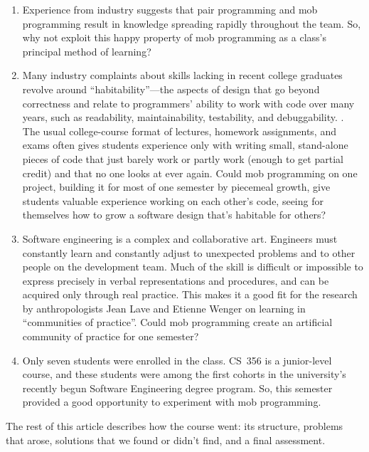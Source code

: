 \documentclass{article}
\begin{document}
\begin{enumerate}
  \item Experience from industry suggests that pair programming and mob
  programming result in knowledge spreading rapidly throughout the team.
  So, why not exploit this happy property of mob programming as a class's
  principal method of learning?

  \item Many industry complaints about skills lacking in recent college
  graduates revolve around ``habitability''---the aspects of design that
  go beyond correctness and relate to programmers' ability to work with
  code over many years, such as readability, maintainability, testability,
  and debuggability. \cite{Gabriel1996}. The usual college-course format
  of lectures, homework assignments, and exams often gives students
  experience only with writing small, stand-alone pieces of code that just
  barely work or partly work (enough to get partial credit) and that no one
  looks at ever again. Could mob programming on one project, building it for
  most of one semester by piecemeal growth, give students valuable experience
  working on each other's code, seeing for themselves how to grow a 
  software design that's habitable for others?

  \item Software engineering is a complex and collaborative art.
  Engineers must constantly learn and constantly adjust to unexpected problems
  and to other people on the development team. Much of the skill is difficult
  or impossible to express precisely in verbal representations and procedures,
  and can be acquired only through real practice. This makes it a good fit for
  the research by anthropologists Jean Lave and Etienne Wenger on learning in
  ``communities of practice''. \cite{wenger2015introduction} Could mob
  programming create an artificial community of practice for one semester?

  \item Only seven students were enrolled in the class. CS~356 is a
  junior-level course, and these students were among the first cohorts in the
  university's recently begun Software Engineering degree program. So,
  this semester provided a good opportunity to experiment with mob
  programming.
\end{enumerate}

The rest of this article describes how the course went: its structure,
problems that arose, solutions that we found or didn't find, and a final
assessment.
\end{document}
